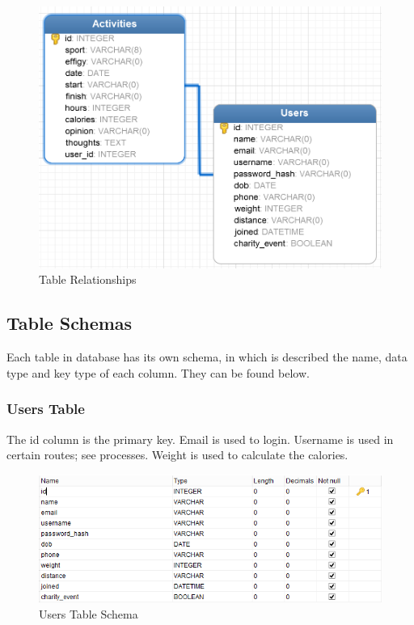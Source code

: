 \documentclass{article}[12pt,a4paper]
\begin{document}
\begin{figure}[h!]
  \includegraphics[scale=0.4]{images/database/er_diagram}
  \caption{Table Relationships}
\end{figure}

\subsection{Table Schemas}
Each table in database has its own schema, in which is described the name, data type and key type of each column. They can be found below.

\subsubsection{Users Table}
The id column is the primary key. Email is used to login. Username is used in certain routes; see processes. Weight is used to calculate the calories.
\begin{figure}[h!]
  \includegraphics[scale=0.65]{images/database/users_schema}
  \caption{Users Table Schema}
\end{figure}
\end{document}
